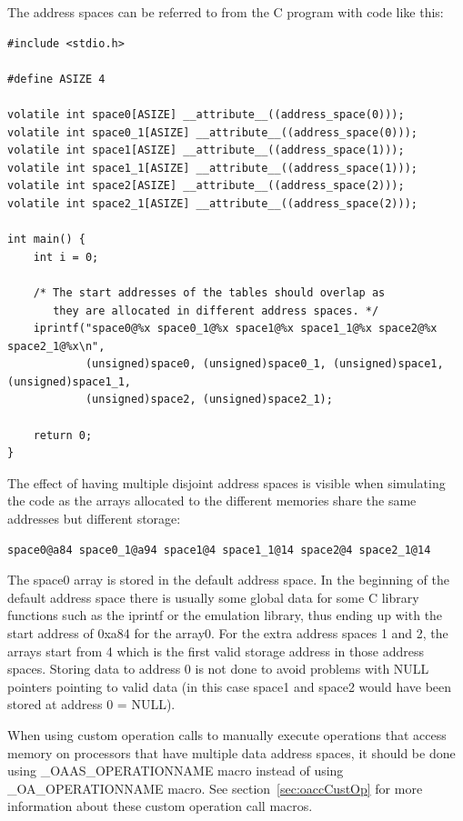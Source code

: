 \documentclass[a4paper,twoside]{tceusermanual}
\begin{document}
The address spaces can be referred to from the C program with code
like this:

\begin{verbatim}
#include <stdio.h>

#define ASIZE 4

volatile int space0[ASIZE] __attribute__((address_space(0)));
volatile int space0_1[ASIZE] __attribute__((address_space(0)));
volatile int space1[ASIZE] __attribute__((address_space(1)));
volatile int space1_1[ASIZE] __attribute__((address_space(1)));
volatile int space2[ASIZE] __attribute__((address_space(2)));
volatile int space2_1[ASIZE] __attribute__((address_space(2)));

int main() {
    int i = 0;

    /* The start addresses of the tables should overlap as
       they are allocated in different address spaces. */
    iprintf("space0@%x space0_1@%x space1@%x space1_1@%x space2@%x space2_1@%x\n",
            (unsigned)space0, (unsigned)space0_1, (unsigned)space1, (unsigned)space1_1,
            (unsigned)space2, (unsigned)space2_1);

    return 0;
}
\end{verbatim}

The effect of having multiple disjoint address spaces is visible when 
simulating the code as the arrays allocated to the different memories share 
the same addresses but different storage:

\begin{verbatim}
space0@a84 space0_1@a94 space1@4 space1_1@14 space2@4 space2_1@14
\end{verbatim}

The space0 array is stored in the default address space. In the beginning
of the default address space there is usually some global data for 
some C library functions
such as the iprintf or the emulation library, thus ending up with the
start address of 0xa84 for the array0. For the extra address spaces
1 and 2, the arrays start from 4 which is the first valid storage address in
those address spaces. Storing data to address 0 is not done to avoid 
problems with NULL pointers pointing to valid data (in this case space1 and
space2 would have been stored at address 0 = NULL).

When using custom operation calls to manually execute operations that access
memory on processors that have multiple data address spaces,
it should be done using \_OAAS\_OPERATIONNAME macro instead of using
\_OA\_OPERATIONNAME macro. See section~\ref{sec:oaccCustOp}
 for more information about these custom operation call macros.
\end{document}

